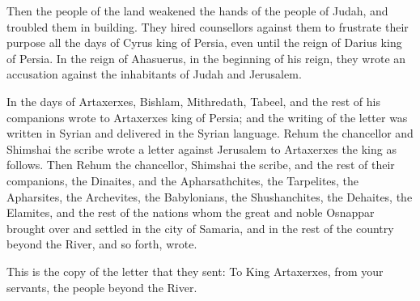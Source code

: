  Then the people of the land weakened the hands of the
people of Judah, and troubled them in building.  They hired
counsellors against them to frustrate their purpose all the days of
Cyrus king of Persia, even until the reign of Darius king of Persia.
 In the reign of Ahasuerus, in the beginning of his reign,
they wrote an accusation against the inhabitants of Judah and Jerusalem.

 In the days of Artaxerxes, Bishlam, Mithredath, Tabeel, and
the rest of his companions wrote to Artaxerxes king of Persia; and the
writing of the letter was written in Syrian and delivered in the Syrian
language.  Rehum the chancellor and Shimshai the scribe
wrote a letter against Jerusalem to Artaxerxes the king as follows.
 Then Rehum the chancellor, Shimshai the scribe, and the
rest of their companions, the Dinaites, and the Apharsathchites, the
Tarpelites, the Apharsites, the Archevites, the Babylonians, the
Shushanchites, the Dehaites, the Elamites,  and the rest of
the nations whom the great and noble Osnappar brought over and settled
in the city of Samaria, and in the rest of the country beyond the River,
and so forth, wrote.

 This is the copy of the letter that they sent: To King
Artaxerxes, from your servants, the people beyond the River.

